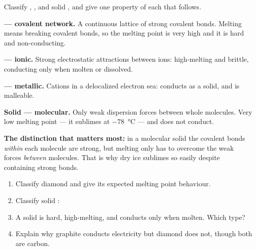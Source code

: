 \documentclass{apchem-worksheet}
\begin{document}
\begin{workedexample}
Classify , ,  and solid , and give one
property of each that follows.

\textbf{ --- covalent network.} A continuous lattice of strong
covalent bonds. Melting means breaking covalent bonds, so the melting
point is very high and it is hard and non-conducting.

\textbf{ --- ionic.} Strong electrostatic attractions between
ions: high-melting and brittle, conducting only when molten or dissolved.

\textbf{ --- metallic.} Cations in a delocalized electron sea:
conducts as a solid, and is malleable.

\textbf{Solid  --- molecular.} Only weak dispersion forces between
whole  molecules. Very low melting point --- it sublimes at
$-78$~\si{\celsius} --- and does not conduct.

\textbf{The distinction that matters most:} in a molecular solid the
covalent bonds \emph{within} each molecule are strong, but melting only
has to overcome the weak forces \emph{between} molecules. That is why dry
ice sublimes so easily despite containing strong  bonds.
\end{workedexample}

\begin{yourturn}
\begin{enumerate}[leftmargin=*,itemsep=0.5em]
  \item Classify diamond and give its expected melting point behaviour.
        \workspace[1.6cm]
  \item Classify solid : \workspace[1.4cm]
  \item A solid is hard, high-melting, and conducts only when molten.
        Which type? \workspace[1.6cm]
  \item Explain why graphite conducts electricity but diamond does not,
        though both are carbon. \workspace[2.0cm]
\end{enumerate}
\end{yourturn}
\end{document}
